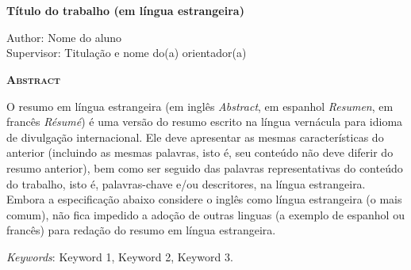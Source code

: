 \chapter*{}

\begin{center}
	{\Large{\textbf{Título do trabalho (em língua estrangeira)}}}
\end{center}

\vspace{1cm}

\begin{flushright}
	Author: Nome do aluno\\
	Supervisor: Titulação e nome do(a) orientador(a)
\end{flushright}

\vspace{1cm}

\begin{center}
	\Large{\textsc{\textbf{Abstract}}}
\end{center}

\noindent O resumo em língua estrangeira (em inglês \textit{Abstract}, em espanhol \textit{Resumen}, em francês \textit{Résumé}) é uma versão do resumo escrito na língua vernácula para idioma de divulgação internacional. Ele deve apresentar as mesmas características do anterior (incluindo as mesmas palavras, isto é, seu conteúdo não deve diferir do resumo anterior), bem como ser seguido das palavras representativas do conteúdo do trabalho, isto é, palavras-chave e/ou descritores, na língua estrangeira. Embora a especificação abaixo considere o inglês como língua estrangeira (o mais comum), não fica impedido a adoção de outras linguas (a exemplo de espanhol ou francês) para redação do resumo em língua estrangeira.


\noindent\textit{Keywords}: Keyword 1, Keyword 2, Keyword 3.



